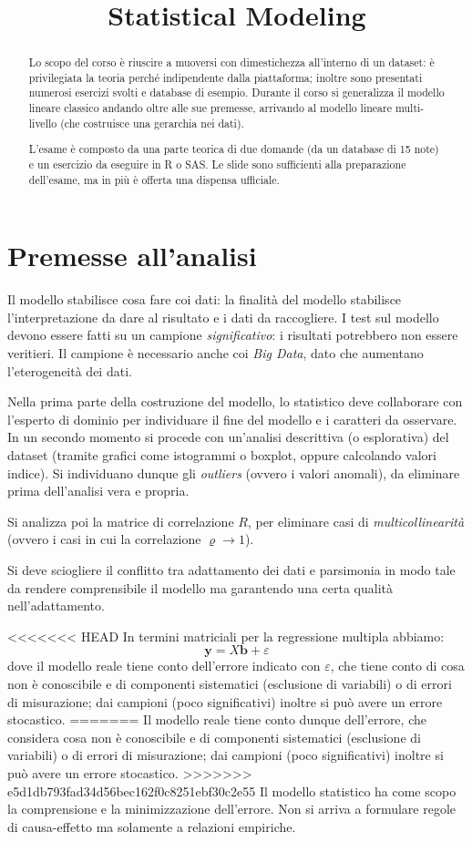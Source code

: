 \documentclass[11pt, twocolumn]{article}
\title{\textbf{Statistical Modeling}}
\author{}
\date{}
\begin{document}
\maketitle
\begin{abstract}
  Lo scopo del corso è riuscire a muoversi con dimestichezza all'interno di un dataset: è privilegiata la teoria perché indipendente dalla piattaforma; inoltre sono presentati numerosi esercizi svolti e database di esempio.
  Durante il corso si generalizza il modello lineare classico andando oltre alle sue premesse, arrivando al modello lineare multi-livello (che costruisce una gerarchia nei dati).

  L'esame è composto da una parte teorica di due domande (da un database di 15 note) e un esercizio da eseguire in R o SAS.
  Le slide sono sufficienti alla preparazione dell'esame, ma in più è offerta una dispensa ufficiale.
\end{abstract}

\newpage
\part{Premesse all'analisi}
Il modello stabilisce cosa fare coi dati: la finalità del modello stabilisce l'interpretazione da dare al risultato e i dati da raccogliere.
I test sul modello devono essere fatti su un campione \textit{significativo}: i risultati potrebbero non essere veritieri.
Il campione è necessario anche coi \textit{Big Data}, dato che aumentano l'eterogeneità dei dati.

Nella prima parte della costruzione del modello, lo statistico deve collaborare con l'esperto di dominio per individuare il fine del modello e i caratteri da osservare.
In un secondo momento si procede con un'analisi descrittiva (o esplorativa) del dataset (tramite grafici come istogrammi o boxplot, oppure calcolando valori indice).
Si individuano dunque gli \textit{outliers} (ovvero i valori anomali), da eliminare prima dell'analisi vera e propria.


Si analizza poi la matrice di correlazione $R$, per eliminare casi di \textit{multicollinearità} (ovvero i casi in cui la correlazione $\varrho \to 1$).

Si deve sciogliere il conflitto tra adattamento dei dati e parsimonia in modo tale da rendere comprensibile il modello ma garantendo una certa qualità nell'adattamento.

<<<<<<< HEAD
In termini matriciali per la regressione multipla abbiamo:
$$\textbf{y} = X \textbf{b} + \varepsilon$$
dove il modello reale tiene conto dell'errore indicato con $\varepsilon$, che tiene conto di cosa non è conoscibile e di componenti sistematici (esclusione di variabili) o di errori di misurazione; dai campioni (poco significativi) inoltre si può avere un errore stocastico.
=======
Il modello reale tiene conto dunque dell'errore, che considera cosa non è conoscibile e di componenti sistematici (esclusione di variabili) o di errori di misurazione; dai campioni (poco significativi) inoltre si può avere un errore stocastico.
>>>>>>> e5d1db793fad34d56bec162f0c8251ebf30c2e55
Il modello statistico ha come scopo la comprensione e la minimizzazione dell'errore.
Non si arriva a formulare regole di causa-effetto ma solamente a relazioni empiriche.
\end{document}
